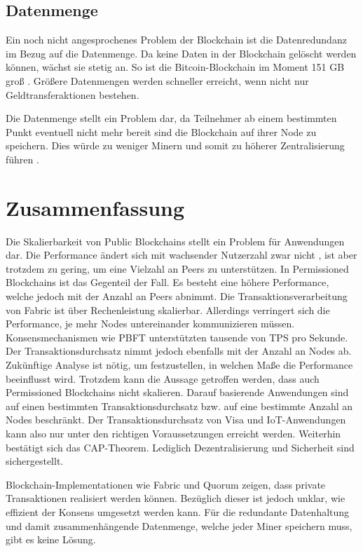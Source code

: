 \subsection{Datenmenge}
Ein noch nicht angesprochenes Problem der Blockchain ist die Datenredundanz im Bezug auf die Datenmenge. Da keine Daten in der Blockchain gelöscht werden können, wächst sie stetig an. So ist die Bitcoin-Blockchain im Moment 151 GB groß \cite{BlockchainUnternehmenBlockchainSizeBitcoin}. Größere Datenmengen werden schneller erreicht, wenn nicht nur Geldtransferaktionen bestehen.

Die Datenmenge stellt ein Problem dar, da Teilnehmer ab einem bestimmten Punkt eventuell nicht mehr bereit sind die Blockchain auf ihrer Node zu speichern. Dies würde zu weniger Minern und somit zu höherer Zentralisierung führen \cite{SchererPerformanceScalabilityBlockchain2017}.

\section{Zusammenfassung}
Die Skalierbarkeit von Public Blockchains stellt ein Problem für Anwendungen dar. Die Performance ändert sich mit wachsender Nutzerzahl zwar nicht \cite{SchererPerformanceScalabilityBlockchain2017}, ist aber trotzdem zu gering, um eine Vielzahl an Peers zu unterstützen. In Permissioned Blockchains ist das Gegenteil der Fall. Es besteht eine höhere Performance, welche jedoch mit der Anzahl an Peers abnimmt. Die Transaktionsverarbeitung von Fabric ist über Rechenleistung skalierbar. Allerdings verringert sich die Performance, je mehr Nodes untereinander kommunizieren müssen. Konsensmechanismen wie \acs{PBFT} unterstützten tausende von \acs{TPS} pro Sekunde. Der Transaktionsdurchsatz nimmt jedoch ebenfalls mit der Anzahl an Nodes ab. Zukünftige Analyse ist nötig, um festzustellen, in welchen Maße die Performance beeinflusst wird. Trotzdem kann die Aussage getroffen werden, dass auch Permissioned Blockchains nicht skalieren. Darauf basierende Anwendungen sind auf einen bestimmten Transaktionsdurchsatz bzw. auf eine bestimmte Anzahl an Nodes beschränkt. Der Transaktionsdurchsatz von Visa und \acs{IoT}-Anwendungen kann also nur unter den richtigen Voraussetzungen erreicht werden. Weiterhin bestätigt sich das CAP-Theorem. Lediglich Dezentralisierung und Sicherheit sind sichergestellt.

Blockchain-Implementationen wie Fabric und Quorum zeigen, dass private Transaktionen realisiert werden können. Bezüglich dieser ist jedoch unklar, wie effizient der Konsens umgesetzt werden kann. Für die redundante Datenhaltung und damit zusammenhängende Datenmenge, welche jeder Miner speichern muss, gibt es keine Lösung.





